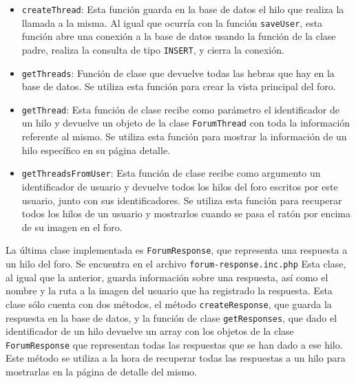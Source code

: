 \documentclass[11pt]{article}
\theoremstyle{plain}
\theoremstyle{definition}
\begin{document}
\begin{itemize}
\item \texttt{createThread}: Esta función guarda en la base de datos
  el hilo que realiza la llamada a la misma. Al igual que ocurría con
  la función \texttt{saveUser}, esta función abre una conexión a la
  base de datos usando la función de la clase padre, realiza la
  consulta de tipo \texttt{INSERT}, y cierra la conexión.
\item \texttt{getThreads}: Función de clase que devuelve todas las
  hebras que hay en la base de datos. Se utiliza esta función para
  crear la vista principal del foro.
\item \texttt{getThread}: Esta función de clase recibe como parámetro
  el identificador de un hilo y devuelve un objeto de la clase
  \texttt{ForumThread} con toda la información referente al mismo.  Se
  utiliza esta función para mostrar la información de un hilo
  específico en su página detalle.
\item \texttt{getThreadsFromUser}: Esta función de clase recibe como
  argumento un identificador de usuario y devuelve todos los hilos del
  foro escritos por este usuario, junto con sus identificadores. Se
  utiliza esta función para recuperar todos los hilos de un usuario y
  mostrarlos cuando se pasa el ratón por encima de su imagen en el
  foro.
\end{itemize}

La última clase implementada es \texttt{ForumResponse}, que representa
una respuesta a un hilo del foro. Se encuentra en el archivo
\texttt{forum-response.inc.php} Esta clase, al igual que la anterior,
guarda información sobre una respuesta, así como el nombre y la ruta a
la imagen del usuario que ha registrado la respuesta. Esta clase sólo
cuenta con dos métodos, el método \texttt{createResponse}, que guarda
la respuesta en la base de datos, y la función de clase
\texttt{getResponses}, que dado el identificador de un hilo devuelve
un array con los objetos de la clase \texttt{ForumResponse} que
representan todas las respuestas que se han dado a ese hilo. Este
método se utiliza a la hora de recuperar todas las respuestas a un
hilo para mostrarlas en la página de detalle del mismo.\\
\end{document}
